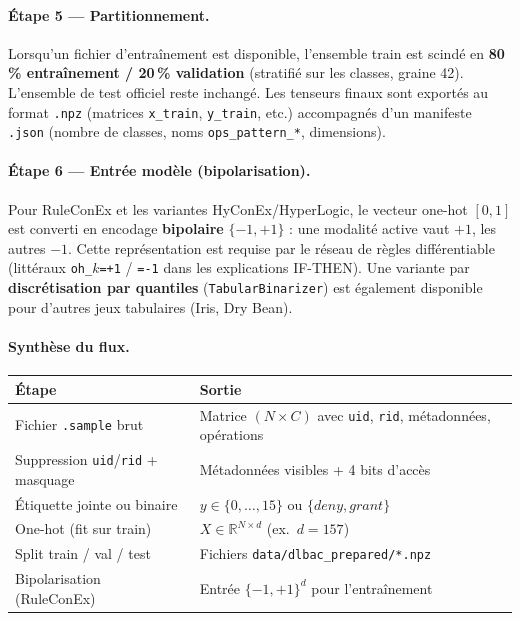 \documentclass[12pt,a4paper]{article}
\begin{document}
\paragraph{\'Etape 5 --- Partitionnement.}
Lorsqu'un fichier d'entra\^inement est disponible, l'ensemble train est scind\'e en \textbf{80\,\% entra\^inement / 20\,\% validation} (stratifi\'e sur les classes, graine 42). L'ensemble de test officiel reste inchang\'e. Les tenseurs finaux sont export\'es au format \texttt{.npz} (matrices \texttt{x\_train}, \texttt{y\_train}, etc.) accompagn\'es d'un manifeste \texttt{.json} (nombre de classes, noms \texttt{ops\_pattern\_*}, dimensions).

\paragraph{\'Etape 6 --- Entr\'ee mod\`ele (bipolarisation).}
Pour RuleConEx et les variantes HyConEx/HyperLogic, le vecteur one-hot $[0,1]$ est converti en encodage \textbf{bipolaire} $\{-1,+1\}$ : une modalit\'e active vaut $+1$, les autres $-1$. Cette repr\'esentation est requise par le r\'eseau de r\`egles diff\'erentiable (litt\'eraux \texttt{oh\_$k$=+1} / \texttt{=-1} dans les explications IF-THEN). Une variante par \textbf{discr\'etisation par quantiles} (\texttt{TabularBinarizer}) est \'egalement disponible pour d'autres jeux tabulaires (Iris, Dry Bean).

\paragraph{Synth\`ese du flux.}
\begin{center}
\small
\begin{tabular}{@{}ll@{}}
\toprule
\textbf{\'Etape} & \textbf{Sortie} \\
\midrule
Fichier \texttt{.sample} brut & Matrice $(N \times C)$ avec \texttt{uid}, \texttt{rid}, m\'etadonn\'ees, op\'erations \\
Suppression \texttt{uid}/\texttt{rid} + masquage & M\'etadonn\'ees visibles + 4 bits d'acc\`es \\
\'Etiquette jointe ou binaire & $y \in \{0,\ldots,15\}$ ou $\{\textit{deny},\textit{grant}\}$ \\
One-hot (fit sur train) & $X \in \mathbb{R}^{N \times d}$ (ex.\ $d=157$) \\
Split train / val / test & Fichiers \texttt{data/dlbac\_prepared/*.npz} \\
Bipolarisation (RuleConEx) & Entr\'ee $\{-1,+1\}^{d}$ pour l'entra\^inement \\
\bottomrule
\end{tabular}
\end{center}
\end{document}
